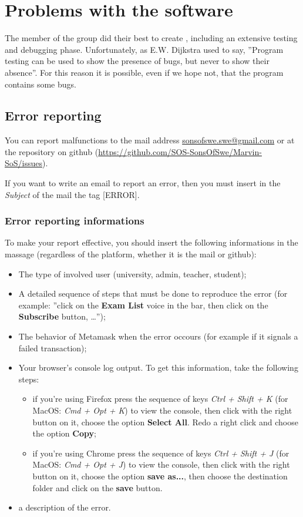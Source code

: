 \newpage
\section{Problems with the software}
The member of the \Group{} group did their best to create \project{}, including an extensive testing and debugging phase. Unfortunately, as E.W. Dijkstra used to say, ''Program testing can be used to show the presence of bugs, but never to show their absence''. For this reason it is possible, even if we hope not, that the program contains some bugs.

\subsection{Error reporting}
You can report malfunctions to the mail address {\href{mailto:sonsofswe.swe@gmail.com}{sonsofswe.swe@gmail.com}} or at the \project{} repository on github (\url{https://github.com/SOS-SonsOfSwe/Marvin-SoS/issues}).

If you want to write an email to report an error, then you must insert in the \emph{Subject} of the mail the tag [ERROR]. 
\subsubsection{Error reporting informations}
To make your report effective, you should insert the following informations in the massage (regardless of the platform, whether it is the mail or github):
\begin{itemize}
	\item The type of  involved user (university, admin, teacher, student);
	\item A detailed sequence of steps that must be done to reproduce the error (for example: ''click on the \textbf{Exam List} voice in the bar, then click on the \textbf{Subscribe} button, 		\dots'');
	\item The behavior of Metamask when the error occours (for example if it signals a failed transaction);
	\item Your browser's console log output. To get this information, take the following steps: 
		\begin{itemize}
			\item 	if you're using Firefox press the sequence of keys \emph{Ctrl + Shift + K} (for MacOS: \emph{Cmd + Opt + K}) to view the console, then click with the right button on it, choose the option \textbf{Select All}. Redo a right click and  choose the option \textbf{Copy};
			\item 	if you're using Chrome press the sequence of keys \emph{Ctrl + Shift + J} (for MacOS: {\emph{Cmd + Opt + J}}) to view the console, then click with the right button on it, choose the option \textbf{save as...}, then choose the destination folder and click on the \textbf{save} button. 
		\end{itemize}
	\item a description of the error.
\end{itemize}